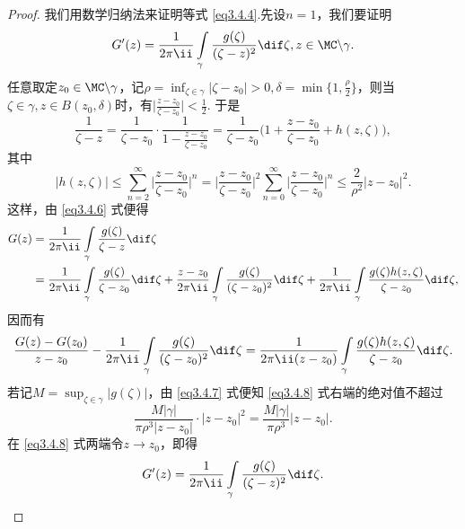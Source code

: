 \begin{proof}
我们用数学归纳法来证明等式 \eqref{eq3.4.4}.先设$n=1$，我们要证明
\begin{equation}\label{eq3.4.5}
G'(z)=\frac1{2\pi\ii}\int\limits_\gamma \frac{g(\zeta)}{(\zeta-z)^2}\dif \zeta,z\in\MC\backslash\gamma.
\end{equation}
任意取定$z_0\in\MC\backslash\gamma$，记$\rho=\inf_{\zeta\in\gamma}|\zeta-z_0|>0,\delta=\min\bigg\{1,\frac\rho2\bigg\}$，则当$\zeta\in\gamma,z\in B(z_0,\delta)$时，有$\bigg|\frac{z-z_0}{\zeta-z_0}\bigg|<\frac12$. 于是
\begin{equation}\label{eq3.4.6}
\frac1{\zeta-z}=\frac1{\zeta-z_0}\cdot\frac1{1-\frac{z-z_0}{\zeta-z_0}}
=\frac1{\zeta-z_0}\bigg(1+\frac{z-z_0}{\zeta-z_0}+h(z,\zeta)\bigg),
\end{equation}
其中
\begin{equation}\label{eq3.4.7}
|h(z,\zeta)|\le\sum_{n=2}^\infty\bigg|\frac{z-z_0}{\zeta-z_0}\bigg|^n
=\bigg|\frac{z-z_0}{\zeta-z_0}\bigg|^2\sum_{n=0}^\infty \bigg|\frac{z-z_0}{\zeta-z_0}\bigg|^n
\le\frac2{\rho^2}|z-z_0|^2.
\end{equation}
这样，由 \eqref{eq3.4.6} 式便得
\begin{align*}
G(z)&=\frac1{2\pi\ii}\int\limits_\gamma\frac{g(\zeta)}{\zeta-z}\dif \zeta\\
&=\frac1{2\pi\ii}\int\limits_\gamma\frac{g(\zeta)}{\zeta-z_0}\dif \zeta+\frac{z-z_0}{2\pi\ii}\int\limits_\gamma\frac{g(\zeta)}{(\zeta-z_0)^2}\dif \zeta
+\frac1{2\pi\ii}\int\limits_\gamma\frac{g(\zeta)h(z,\zeta)}{\zeta-z_0}\dif \zeta,
\end{align*}
因而有
\begin{equation}\label{eq3.4.8}
\frac{G(z)-G(z_0)}{z-z_0}-\frac1{2\pi\ii}\int\limits_\gamma\frac{g(\zeta)}{(\zeta-z_0)^2}\dif \zeta=\frac1{2\pi\ii(z-z_0)}\int\limits_\gamma\frac{g(\zeta)h(z,\zeta)}{\zeta-z_0}\dif \zeta.
\end{equation}
若记$M=\sup_{\zeta\in\gamma}|g(\zeta)|$，由 \eqref{eq3.4.7} 式便知 \eqref{eq3.4.8} 式右端的绝对值不超过
\[\frac{M|\gamma|}{\pi\rho^3|z-z_0|}\cdot|z-z_0|^2=\frac{M|\gamma|}{\pi\rho^3}|z-z_0|.\]
在 \eqref{eq3.4.8} 式两端令$z\to z_0$，即得
\[G'(z)=\frac1{2\pi\ii}\int\limits_\gamma\frac{g(\zeta)}{(\zeta-z)^2}\dif \zeta.\]


\end{proof}
